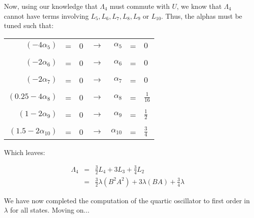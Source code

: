 \documentclass{article}
\begin{document}
Now, using our knowledge that $\Lambda_{4}$ must commute with $U$, we know that $\Lambda_{4}$ cannot have terms involving $L_{5}, L_{6}, L_{7}, L_{8}, L_{9}$ or $L_{10}$.  Thus, the alphas must be tuned such that:

\begin{table}[!h]
\begin{center}
\begin{tabular}{rclcrcl}
 $(-4\alpha_5)       $ & = & 0 & $\rightarrow$ & $\alpha_5   $ & = & $0           $  \\ 
                       &   &   &               &               &   &                 \\
 $(-2\alpha_6)       $ & = & 0 & $\rightarrow$ & $\alpha_6   $ & = & $0           $  \\
                       &   &   &               &               &   &                 \\
 $(-2\alpha_7)       $ & = & 0 & $\rightarrow$ & $\alpha_7   $ & = & $0           $  \\
                       &   &   &               &               &   &                 \\
 $(0.25-4\alpha_8)   $ & = & 0 & $\rightarrow$ & $\alpha_8   $ & = & $\frac{1}{16}$  \\
                       &   &   &               &               &   &                 \\
 $(1-2\alpha_9)      $ & = & 0 & $\rightarrow$ & $\alpha_9   $ & = & $\frac{1}{2} $  \\
                       &   &   &               &               &   &                 \\
 $(1.5-2\alpha_{10}) $ & = & 0 & $\rightarrow$ & $\alpha_{10}$ & = & $\frac{3}{4} $ 
\end{tabular}
\end{center}
\end{table}

\newpage

Which leaves:

\begin{eqnarray}
\Lambda_{4} & = & \frac{3}{2}L_{4} + 3L_{3} + \frac{3}{4}L_{2} \\
            & = & \frac{3}{2}\lambda(B^{2}A^{2}) + 3\lambda(BA) + \frac{3}{4}\lambda 
\end{eqnarray}

We have now completed the computation of the quartic oscillator to first order in $\lambda$ for all states.  Moving on...
\end{document}
